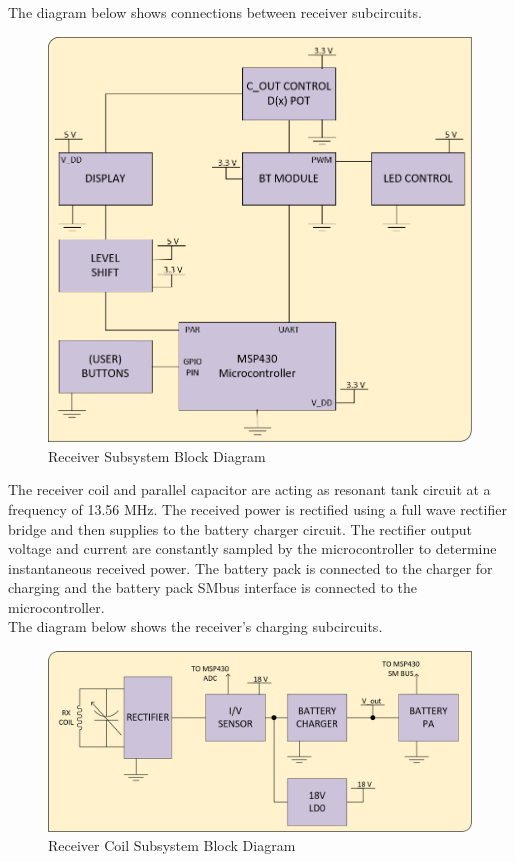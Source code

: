 \documentclass[12pt]{article}
\begin{document}
\indent
The diagram below shows connections between receiver subcircuits. 
\hfill

\begin{figure}[h!]
\centering
\includegraphics[width=0.88\linewidth]{controller_block.png}
\caption{Receiver Subsystem Block Diagram}
\end{figure}

\hfill

\pagebreak
\indent
The receiver coil and parallel capacitor are acting as resonant tank circuit at a frequency of 13.56 MHz. The received power is rectified using a full wave rectifier bridge and then supplies to the battery charger circuit. The rectifier output voltage and current are constantly sampled by the microcontroller to determine instantaneous received power. The battery pack is connected to the charger for charging and the battery pack SMbus interface is connected to the microcontroller. \\

\indent
The diagram below shows the receiver’s charging subcircuits.
\hfill

\begin{figure}[h!]
\centering
\includegraphics[width=0.88\linewidth]{recv_coil}
\caption{Receiver Coil Subsystem Block Diagram}
\end{figure}
\end{document}
